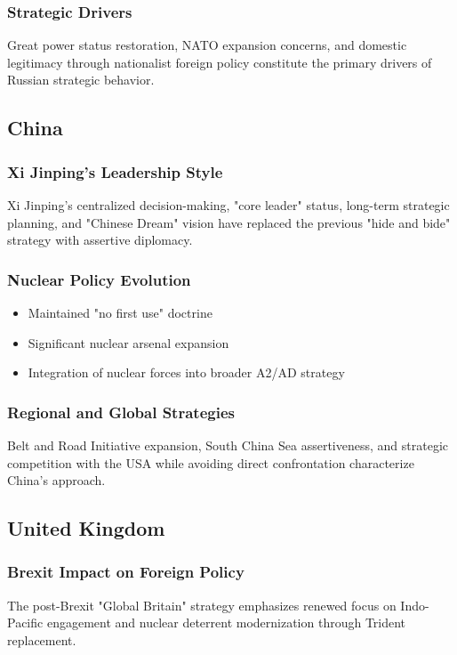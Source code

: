 \documentclass[a4paper, 11pt]{article}
\begin{document}
\subsubsection{Strategic Drivers}
Great power status restoration, NATO expansion concerns, and domestic legitimacy through nationalist foreign policy constitute the primary drivers of Russian strategic behavior.

\subsection{China}

\subsubsection{Xi Jinping's Leadership Style}
Xi Jinping's centralized decision-making, "core leader" status, long-term strategic planning, and "Chinese Dream" vision have replaced the previous "hide and bide" strategy with assertive diplomacy.

\subsubsection{Nuclear Policy Evolution}
\begin{itemize}
	\item Maintained "no first use" doctrine
	\item Significant nuclear arsenal expansion
	\item Integration of nuclear forces into broader A2/AD strategy
\end{itemize}

\subsubsection{Regional and Global Strategies}
Belt and Road Initiative expansion, South China Sea assertiveness, and strategic competition with the USA while avoiding direct confrontation characterize China's approach.

\subsection{United Kingdom}

\subsubsection{Brexit Impact on Foreign Policy}
The post-Brexit "Global Britain" strategy emphasizes renewed focus on Indo-Pacific engagement and nuclear deterrent modernization through Trident replacement.
\end{document}
